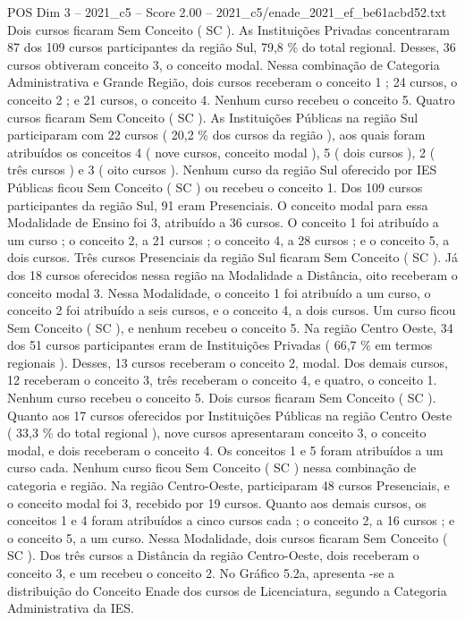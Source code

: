 \begin{textsample}{POS Dim 3 – 2021\_c5 – Score 2.00 – 2021\_c5/enade\_2021\_ef\_be61acbd52.txt}
Dois cursos ficaram Sem Conceito ( SC ).
As Instituições Privadas concentraram 87 dos 109 cursos participantes da região Sul, 79,8 \% do total regional.
Desses, 36 cursos obtiveram conceito 3, o conceito modal.
Nessa combinação de Categoria Administrativa e Grande Região, dois cursos receberam o conceito 1 ; 24 cursos, o conceito 2 ; e 21 cursos, o conceito 4.
Nenhum curso recebeu o conceito 5.
Quatro cursos ficaram Sem Conceito ( SC ).
As Instituições Públicas na região Sul participaram com 22 cursos ( 20,2 \% dos cursos da região ), aos quais foram atribuídos os conceitos 4 ( nove cursos, conceito modal ), 5 ( dois cursos ), 2 ( três cursos ) e 3 ( oito cursos ).
Nenhum curso da região Sul oferecido por IES Públicas ficou Sem Conceito ( SC ) ou recebeu o conceito 1.
Dos 109 cursos participantes da região Sul, 91 eram Presenciais.
O conceito modal para essa Modalidade de Ensino foi 3, atribuído a 36 cursos.
O conceito 1 foi atribuído a um curso ; o conceito 2, a 21 cursos ; o conceito 4, a 28 cursos ; e o conceito 5, a dois cursos.
Três cursos Presenciais da região Sul ficaram Sem Conceito ( SC ).
Já dos 18 cursos oferecidos nessa região na Modalidade a Distância, oito receberam o conceito modal 3.
Nessa Modalidade, o conceito 1 foi atribuído a um curso, o conceito 2 foi atribuído a seis cursos, e o conceito 4, a dois cursos.
Um curso ficou Sem Conceito ( SC ), e nenhum recebeu o conceito 5.
Na região Centro Oeste, 34 dos 51 cursos participantes eram de Instituições Privadas ( 66,7 \% em termos regionais ).
Desses, 13 cursos receberam o conceito 2, modal.
Dos demais cursos, 12 receberam o conceito 3, três receberam o conceito 4, e quatro, o conceito 1.
Nenhum curso recebeu o conceito 5.
Dois cursos ficaram Sem Conceito ( SC ).
Quanto aos 17 cursos oferecidos por Instituições Públicas na região Centro Oeste ( 33,3 \% do total regional ), nove cursos apresentaram conceito 3, o conceito modal, e dois receberam o conceito 4.
Os conceitos 1 e 5 foram atribuídos a um curso cada.
Nenhum curso ficou Sem Conceito ( SC ) nessa combinação de categoria e região.
Na região Centro-Oeste, participaram 48 cursos Presenciais, e o conceito modal foi 3, recebido por 19 cursos.
Quanto aos demais cursos, os conceitos 1 e 4 foram atribuídos a cinco cursos cada ; o conceito 2, a 16 cursos ; e o conceito 5, a um curso.
Nessa Modalidade, dois cursos ficaram Sem Conceito ( SC ).
Dos três cursos a Distância da região Centro-Oeste, dois receberam o conceito 3, e um recebeu o conceito 2.
No Gráfico 5.2a, apresenta -se a distribuição do Conceito Enade dos cursos de Licenciatura, segundo a Categoria Administrativa da IES.

\end{textsample}
